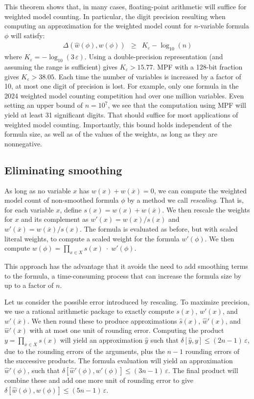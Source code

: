 \documentclass[letterpaper,USenglish,cleveref, autoref, thm-restate]{lipics-v2021}
\newcommand{\obar}[1]{\overline{#1}}
\newcommand{\approximate}[1]{\hat{#1}}
\newcommand{\approxy}{\approximate{y}}
\newcommand{\approxw}{\approximate{w}}
\newcommand{\approxs}{\approximate{s}}
\newcommand{\aerror}{\delta}
\newcommand{\digitprecision}{\Delta}
\newcommand{\roundepsilon}{\varepsilon}
\newcommand{\varset}{X}
\begin{document}
This theorem shows that, in many cases, floating-point arithmetic will suffice for weighted model counting.  In particular, the digit precision
resulting when computing an approximation for the weighted model count for $n$-variable formula $\phi$ will satisfy:
\begin{eqnarray}
\digitprecision(\approxw(\phi), w(\phi)) & \geq & K_{\roundepsilon} - \log_{10}(n) \label{eqn:precision:wmc}
\end{eqnarray}
where $K_{\roundepsilon} = -\log_{10}(3\,\roundepsilon)$.  Using a
double-precision representation (and assuming the range is
sufficient) gives $K_{\roundepsilon} > 15.77$.  MPF with a
128-bit fraction gives $K_{\roundepsilon} > 38.05$.  Each time
the number of variables is increased by a factor of 10, at most one
digit of precision is lost.  For example, only one formula in the 2024
weighted model counting competition had over one million variables.
Even setting an upper bound of $n = 10^7$, we see that the computation using
MPF will yield at least 31 significant digits.  That should suffice for most applications of weighted model counting.
Importantly, this bound holds independent of the formula size, as well as of the values of the weights, as long as they are nonnegative.

\subsection{Eliminating smoothing}

As long as no variable $x$ has $w(x) + w(\obar{x}) = 0$, we can 
compute the weighted model count of non-smoothed formula $\phi$ by a method we call
\emph{rescaling}.  That is, for each variable $x$, define $s(x) = w(x)
+ w(\obar{x})$.  We then rescale the weights for $x$ and its
complement as $w'(x) = w(x)/s(x)$ and $w'(\obar{x}) = w(\obar{x})/s(x)$.  The formula is evaluated as before, but with
scaled literal weights, to compute a scaled weight for the formula $w'(\phi)$.  We then
compute $w(\phi) = \prod_{x\in\varset} s(x) \; \cdot \; w'(\phi)$.

This approach has the advantage that it avoids the need to add
smoothing terms to the formula, a time-consuming process that can
increase the formula size by up to a factor of $n$.

Let us consider the possible error introduced by rescaling.  To maximize precision, we
use a rational arithmetic package to exactly compute $s(x)$, $w'(x)$, and $w'(\obar{x})$.  We then round these to produce
approximations $\approxs(x)$, $\approxw'(x)$, and $\approxw'(\obar{x})$ with at most one unit of rounding error.
Computing the product $y = \prod_{x\in\varset} s(x)$ will yield an approximation $\approxy$ such that
$\aerror[\approxy, y] \leq (2n-1) \,\roundepsilon$, due to the rounding errors of the arguments, plus the $n-1$ rounding errors of the successive products.
The formula evaluation will yield an approximation $\approxw'(\phi)$, such that
$\aerror[\approxw'(\phi), w'(\phi)] \leq (3n-1) \,\roundepsilon$.  The final product will combine these and add one more unit of rounding error to give
$\aerror[\approxw(\phi), w(\phi)] \leq (5n-1) \,\roundepsilon$.
\end{document}
